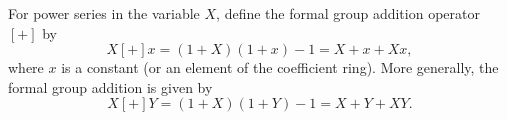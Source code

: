 For power series in the variable $X$, define the formal group addition operator $[+]$ by
$$
X [+] x = (1+X)(1+x) - 1 = X + x + Xx,
$$
where $x$ is a constant (or an element of the coefficient ring).
More generally, the formal group addition is given by
$$
X [+] Y = (1+X)(1+Y) - 1 = X + Y + XY.
$$
